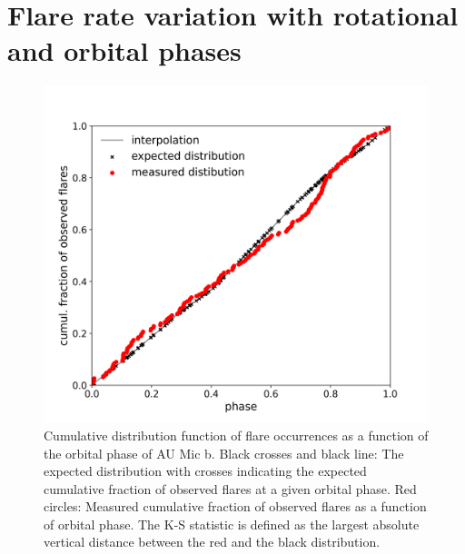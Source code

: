 \documentclass[fleqn,usenatbib,letters]{mnras}%
\begin{document}
\section{Flare rate variation with rotational and orbital phases}
\label{sec:phases}

\begin{figure}
\includegraphics[width=\hsize]{figures/2021_06_08_AUMic_KS_Test_cumdist_total_Both_Sectors_Orbit.png} 
\caption{Cumulative distribution function of flare occurrences as a function of the orbital phase of AU Mic b. Black crosses and black line: The expected distribution with crosses indicating the expected cumulative fraction of observed flares at a given orbital phase. Red circles: Measured cumulative fraction of observed flares as a function of orbital phase. The K-S statistic is defined as the largest absolute vertical distance between the red and the black distribution.}
\label{fig:cumdist}
\end{figure}
\end{document}
